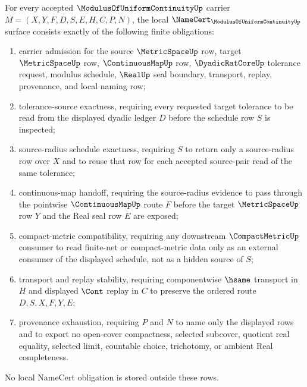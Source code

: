 \begin{theorem}
\label{thm:modulus-of-uniform-continuity-namecert-obligations}
For every accepted $\ModulusOfUniformContinuityUp$ carrier $M=(X,Y,F,D,S,E,H,C,P,N)$, the local $\NameCert_{\ModulusOfUniformContinuityUp}$ surface consists exactly of the following finite obligations:
\begin{enumerate}
\item carrier admission for the source $\MetricSpaceUp$ row, target $\MetricSpaceUp$ row, $\ContinuousMapUp$ row, $\DyadicRatCoreUp$ tolerance request, modulus schedule, $\RealUp$ seal boundary, transport, replay, provenance, and local naming row;
\item tolerance-source exactness, requiring every requested target tolerance to be read from the displayed dyadic ledger $D$ before the schedule row $S$ is inspected;
\item source-radius schedule exactness, requiring $S$ to return only a source-radius row over $X$ and to reuse that row for each accepted source-pair read of the same tolerance;
\item continuous-map handoff, requiring the source-radius evidence to pass through the pointwise $\ContinuousMapUp$ route $F$ before the target $\MetricSpaceUp$ row $Y$ and the Real seal row $E$ are exposed;
\item compact-metric compatibility, requiring any downstream $\CompactMetricUp$ consumer to read finite-net or compact-metric data only as an external consumer of the displayed schedule, not as a hidden source of $S$;
\item transport and replay stability, requiring componentwise $\hsame$ transport in $H$ and displayed $\Cont$ replay in $C$ to preserve the ordered route $D,S,X,F,Y,E$;
\item provenance exhaustion, requiring $P$ and $N$ to name only the displayed rows and to export no open-cover compactness, selected subcover, quotient real equality, selected limit, countable choice, trichotomy, or ambient Real completeness.
\end{enumerate}
No local NameCert obligation is stored outside these rows.
\end{theorem}
